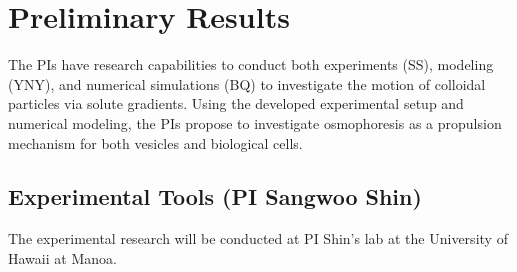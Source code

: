 \documentclass[11pt]{article}
\begin{document}
\section{Preliminary Results\label{sec:preliminary_results}} The PIs
have research capabilities to conduct both experiments (SS), modeling
(YNY), and numerical simulations (BQ) to investigate the motion of
colloidal particles via solute gradients.  Using the developed
experimental setup and numerical modeling, the PIs propose to
investigate osmophoresis as a propulsion mechanism for both vesicles and
biological cells. 

\subsection{Experimental Tools (PI Sangwoo Shin)}
\label{subsection:exp_tools}
The experimental research will be conducted at PI Shin's lab at the
University of Hawaii at Manoa.

\end{document}
